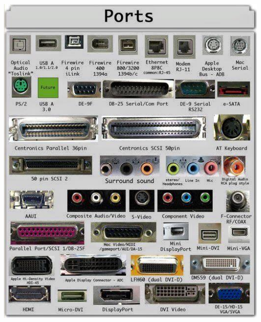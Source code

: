 \documentclass{article}
\begin{document}
\begin{itemize}
\begin{center}
                    \includegraphics[width=(\textwidth / 2) - 15pt]{images/Connectors-2.jpg}
                \end{center}
    \end{itemize}
\end{document}
